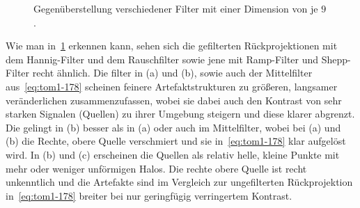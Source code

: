 \documentclass[slug=PET, room=Andreas-Schubert-Bau\,\ 424A, supervisor=Carsten\ Bittrich, coursedate=10.\ 01.\ 2020]{../../Lab_Report_LaTeX/lab_report}
\begin{document}
\begin{figure}[h]
  \centering
  \caption{Gegenüberstellung verschiedener Filter mit einer Dimension
    von je \(9\).}
  \label{fig:filter}
\end{figure}

Wie man in~\ref{fig:filter} erkennen kann, sehen sich die gefilterten
Rückprojektionen mit dem Hannig-Filter und dem Rauschfilter sowie jene
mit Ramp-Filter und Shepp-Filter recht ähnlich. Die filter in (a) und
(b), sowie auch der Mittelfilter aus~\ref{eq:tom1-178} scheinen
feinere Artefaktstrukturen zu gr\"o\ss{}eren, langsamer
ver\"anderlichen zusammenzufassen, wobei sie dabei auch den Kontrast von
sehr starken Signalen (Quellen) zu ihrer Umgebung steigern und diese
klarer abgrenzt. Die gelingt in (b) besser als in (a) oder auch im
Mittelfilter, wobei bei (a) und (b) die Rechte, obere Quelle
verschmiert und sie in~\ref{eq:tom1-178} klar aufgel\"ost wird. In (b)
und (c) erscheinen die Quellen als relativ helle, kleine Punkte mit
mehr oder weniger unf\"ormigen Halos. Die rechte obere Quelle ist
recht unkenntlich und die Artefakte sind im Vergleich zur
ungefilterten R\"uckprojektion in~\ref{eq:tom1-178} breiter bei nur
geringf\"ugig verringertem Kontrast. \\
\end{document}
